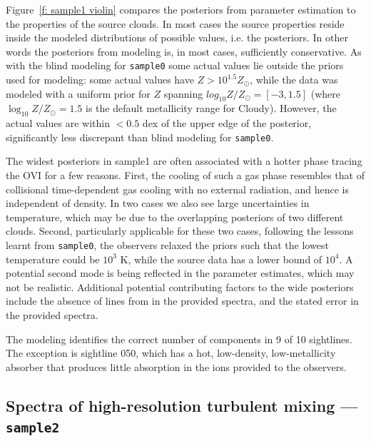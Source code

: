\documentclass[fleqn,usenatbib]{mnras}
\begin{document}
Figure~\ref{f: sample1 violin} compares the posteriors from parameter estimation to the properties of the source clouds.
In most cases the source properties reside inside the modeled distributions of possible values, i.e. the posteriors.
In other words the posteriors from modeling is, in most cases, sufficiently conservative.
As with the blind modeling for \texttt{sample0} some actual values lie outside the priors used for modeling: some actual values have $Z > 10^{1.5} Z_\odot$, while the data was modeled with a uniform prior for $Z$ spanning $log_{10} Z/Z_\odot = [-3, 1.5]$ (where $\log_{10} Z/Z_\odot = 1.5$ is the default metallicity range for Cloudy).
However, the actual values are within $< 0.5$ dex of the upper edge of the posterior, significantly less discrepant than blind modeling for \texttt{sample0}.

The widest posteriors in sample1 are often associated with a hotter phase tracing the OVI for a few reasons.
First, the cooling of such a gas phase resembles that of collisional time-dependent gas cooling with no external radiation, and hence is independent of density.
In two cases we also see large uncertainties in temperature, which may be due to the overlapping posteriors of two different clouds.
Second, particularly applicable for these two cases, following the lessons learnt from \texttt{sample0}, the observers relaxed the priors such that the lowest temperature could be $10^3$ K, while the source data has a lower bound of $10^4$.
A potential second mode is being reflected in the parameter estimates, which may not be realistic. 
Additional potential contributing factors to the wide posteriors include the absence of  lines from in the provided spectra, 
and the stated error in the provided spectra.

The modeling identifies the correct number of components in 9 of 10 sightlines.
The exception is sightline 050, which has a hot, low-density, low-metallicity absorber that produces little absorption in the ions provided to the observers.

\subsection{Spectra of high-resolution turbulent mixing --- \texttt{sample2}}
\label{s: results -- sample2}
\end{document}
